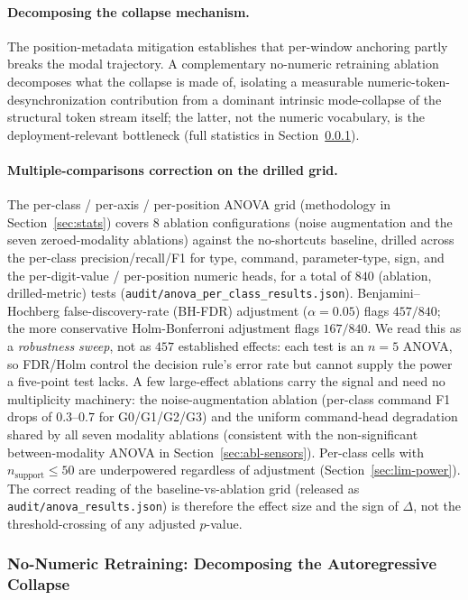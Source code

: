 \documentclass[sensors,article,submit,moreauthors,pdftex]{Definitions/mdpi}
\begin{document}
\paragraph{Decomposing the collapse mechanism.} The position-metadata mitigation establishes that per-window anchoring partly breaks the modal trajectory. A complementary no-numeric retraining ablation decomposes what the collapse is made of, isolating a measurable numeric-token-desynchronization contribution from a dominant intrinsic mode-collapse of the structural token stream itself; the latter, not the numeric vocabulary, is the deployment-relevant bottleneck (full statistics in Section~\ref{sec:abl-nonumeric}).

\paragraph{Multiple-comparisons correction on the drilled grid.} The per-class / per-axis / per-position ANOVA grid (methodology in Section~\ref{sec:stats}) covers 8 ablation configurations (noise augmentation and the seven zeroed-modality ablations) against the no-shortcuts baseline, drilled across the per-class precision/recall/F1 for type, command, parameter-type, sign, and the per-digit-value / per-position numeric heads, for a total of $840$ (ablation, drilled-metric) tests (\texttt{audit/anova\_per\_class\_results.json}). Benjamini--Hochberg false-discovery-rate (BH-FDR) adjustment ($\alpha=0.05$) flags $457 / 840$; the more conservative Holm-Bonferroni adjustment flags $167 / 840$. We read this as a \emph{robustness sweep}, not as $457$ established effects: each test is an $n\!=\!5$ ANOVA, so FDR/Holm control the decision rule's error rate but cannot supply the power a five-point test lacks. A few large-effect ablations carry the signal and need no multiplicity machinery: the noise-augmentation ablation (per-class command F1 drops of $0.3$--$0.7$ for G0/G1/G2/G3) and the uniform command-head degradation shared by all seven modality ablations (consistent with the non-significant between-modality ANOVA in Section~\ref{sec:abl-sensors}). Per-class cells with $n_{\text{support}}\le 50$ are underpowered regardless of adjustment (Section~\ref{sec:lim-power}). The correct reading of the baseline-vs-ablation grid (released as \texttt{audit/anova\_results.json}) is therefore the effect size and the sign of $\Delta$, not the threshold-crossing of any adjusted $p$-value.

\subsubsection{No-Numeric Retraining: Decomposing the Autoregressive Collapse}
\label{sec:abl-nonumeric}
\end{document}
